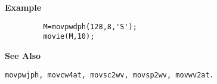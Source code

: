 {\bf \large \sf Example}
\begin{verbatim}
         M=movpwdph(128,8,'S'); 
         movie(M,10);
\end{verbatim}
\vspace*{.5cm}


{\bf \large \sf See Also}\\
\hspace*{1.5cm}
\begin{minipage}[t]{13.5cm}
\begin{verbatim}
movpwjph, movcw4at, movsc2wv, movsp2wv, movwv2at.
\end{verbatim}
\end{minipage}
